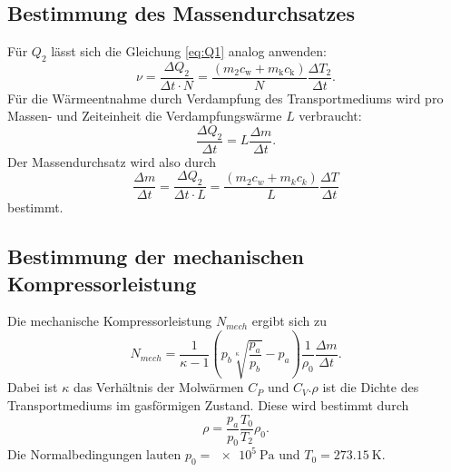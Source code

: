 \subsection{Bestimmung des Massendurchsatzes}
Für $Q_2$ lässt sich die Gleichung \ref{eq:Q1} analog anwenden:
\begin{equation*}
    \nu = \frac{\Delta Q_2}{\Delta t \cdot N} = \frac{(m_2 c_\text{w} + m_\text{k} c_\text{k})}{N} \frac{\Delta T_2}{\Delta t}.
\end{equation*}
Für die Wärmeentnahme durch Verdampfung des Transportmediums
wird pro Massen- und Zeiteinheit die Verdampfungswärme $L$ 
verbraucht:
\begin{equation*}
    \frac{\Delta Q_2}{\Delta t} = L \frac{\Delta m}{\Delta t}.
\end{equation*}
Der Massendurchsatz wird also durch
\begin{equation}
    \frac{\Delta m}{\Delta t} = \frac{\Delta Q_2}{\Delta t \cdot L} = \frac{(m_2 c_w + m_k c_k)}{L} \frac{\Delta T}{\Delta t} %
    \label{eqn:massendurchsatz}
\end{equation}
bestimmt.

\subsection{Bestimmung der mechanischen Kompressorleistung}
Die mechanische Kompressorleistung $N_{mech}$ ergibt sich zu
\begin{equation}
    N_{mech} = \frac{1}{\kappa - 1} (p_b \sqrt[\kappa]{\frac{p_a}{p_b}} - p_a)\frac{1}{\rho_0}\frac{\Delta m}{\Delta t}. 
    \label{eqn:nmech}
\end{equation}
Dabei ist $\kappa$ das Verhältnis der Molwärmen $C_P$ und $C_V$.$\rho$ ist die Dichte
des Transportmediums im gasförmigen Zustand. Diese wird bestimmt durch
\begin{equation}
    \rho = \frac{p_a}{p_0} \frac{T_0}{T_2} \rho_0.
    \label{eqn:dichte}
\end{equation}
Die Normalbedingungen lauten $p_0 = \SI{e5}{\pascal}$ und $T_0 = \SI{273.15}{\kelvin}$.